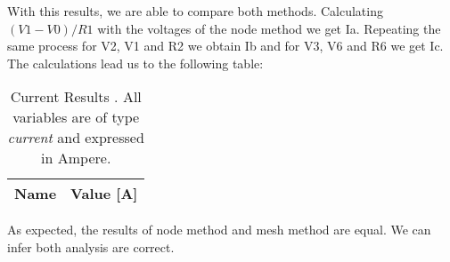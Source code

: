 With this results, we are able to compare both methods. Calculating $(V1-V0)/R1$ with the voltages of the node method we get Ia. Repeating the same process for V2, V1 and R2 we obtain Ib and for V3, V6 and R6 we get Ic. The calculations lead us to the following table:


\begin{table}[h]
  \centering
  \begin{tabular}{|l|r|}
    \hline    
    {\bf Name} & {\bf Value [A]} \\ \hline
    
  \end{tabular}
  \caption{Current Results . All variables are of type {\em current}
    and expressed in Ampere.}
  \label{tab:nos}
\end{table}

As expected, the results of node method and mesh method are equal. We can infer both analysis are correct.

